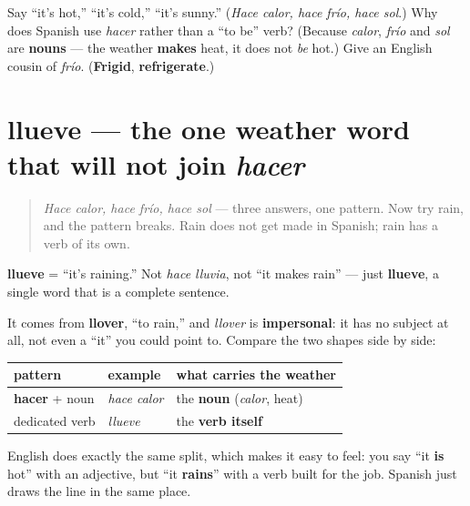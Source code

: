 \begin{tcolorbox}[breakable,colback=teal!4,colframe=teal!35!black,title={Before you move on}]
Say \textquotedblleft{}it's hot,\textquotedblright{} \textquotedblleft{}it's cold,\textquotedblright{} \textquotedblleft{}it's sunny.\textquotedblright{} (\emph{Hace calor, hace frío, hace sol}.) Why does Spanish use \emph{hacer} rather than a \textquotedblleft{}to be\textquotedblright{} verb? (Because \emph{calor}, \emph{frío} and \emph{sol} are \textbf{nouns} — the weather \textbf{makes} heat, it does not \emph{be} hot.) Give an English cousin of \emph{frío}. (\textbf{Frigid}, \textbf{refrigerate}.)
\end{tcolorbox}
\section[llueve]{llueve — the one weather word that will not join \emph{hacer}}

\label{lesson:ES-C30-llueve}



\begin{quote}
\emph{Hace calor, hace frío, hace sol} — three answers, one pattern. Now try rain, and the pattern breaks. Rain does not get made in Spanish; rain has a verb of its own.
\end{quote}

\begin{grammarlens}[title={Grammar Lens: rain brings its own verb}]
\textbf{llueve} = \textquotedblleft{}it's raining.\textquotedblright{} Not \emph{hace lluvia}, not \textquotedblleft{}it makes rain\textquotedblright{} — just \textbf{llueve}, a single word that is a complete sentence.

It comes from \textbf{llover}, \textquotedblleft{}to rain,\textquotedblright{} and \emph{llover} is \textbf{impersonal}: it has no subject at all, not even a \textquotedblleft{}it\textquotedblright{} you could point to. Compare the two shapes side by side:

\noindent
\begin{tabularx}{\linewidth}{@{}>{\raggedright\arraybackslash}X>{\raggedright\arraybackslash}X>{\raggedright\arraybackslash}X@{}}
\toprule
\textbf{pattern} & \textbf{example} & \textbf{what carries the weather} \\
\midrule
\textbf{hacer} + noun & \emph{hace calor} & the \textbf{noun} (\emph{calor}, heat) \\
dedicated verb & \emph{llueve} & the \textbf{verb itself} \\
\bottomrule
\end{tabularx}

English does exactly the same split, which makes it easy to feel: you say \textquotedblleft{}it \textbf{is} hot\textquotedblright{} with an adjective, but \textquotedblleft{}it \textbf{rains}\textquotedblright{} with a verb built for the job. Spanish just draws the line in the same place.
\end{grammarlens}

